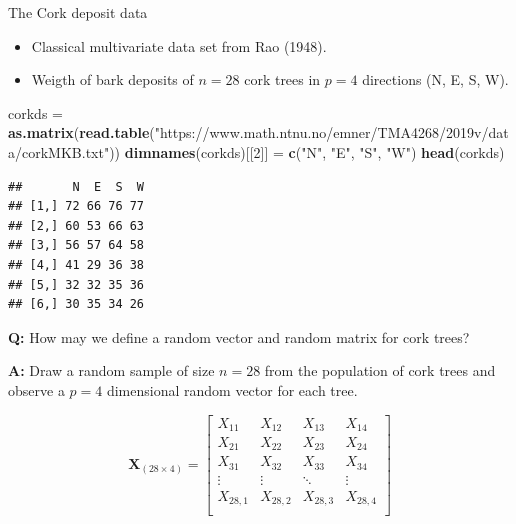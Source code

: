 \documentclass[ignorenonframetext,]{beamer}
\newenvironment{Shaded}{\begin{snugshade}}{\end{snugshade}}
\newcommand{\KeywordTok}[1]{\textcolor[rgb]{0.13,0.29,0.53}{\textbf{#1}}}
\newcommand{\DecValTok}[1]{\textcolor[rgb]{0.00,0.00,0.81}{#1}}
\newcommand{\StringTok}[1]{\textcolor[rgb]{0.31,0.60,0.02}{#1}}
\newcommand{\NormalTok}[1]{#1}
\providecommand{\tightlist}{%
  \setlength{\itemsep}{0pt}\setlength{\parskip}{0pt}}
\begin{document}
\begin{frame}[fragile]

\begin{block}{The Cork deposit data}

\begin{itemize}
\tightlist
\item
  Classical multivariate data set from Rao (1948).
\item
  Weigth of bark deposits of \(n=28\) cork trees in \(p=4\) directions
  (N, E, S, W).
\end{itemize}

\begin{Shaded}
\begin{Highlighting}[]
\NormalTok{corkds =}\StringTok{ }\KeywordTok{as.matrix}\NormalTok{(}\KeywordTok{read.table}\NormalTok{(}\StringTok{"https://www.math.ntnu.no/emner/TMA4268/2019v/data/corkMKB.txt"}\NormalTok{))}
\KeywordTok{dimnames}\NormalTok{(corkds)[[}\DecValTok{2}\NormalTok{]] =}\StringTok{ }\KeywordTok{c}\NormalTok{(}\StringTok{"N"}\NormalTok{, }\StringTok{"E"}\NormalTok{, }\StringTok{"S"}\NormalTok{, }\StringTok{"W"}\NormalTok{)}
\KeywordTok{head}\NormalTok{(corkds)}
\end{Highlighting}
\end{Shaded}

\begin{verbatim}
##       N  E  S  W
## [1,] 72 66 76 77
## [2,] 60 53 66 63
## [3,] 56 57 64 58
## [4,] 41 29 36 38
## [5,] 32 32 35 36
## [6,] 30 35 34 26
\end{verbatim}

\textbf{Q:} How may we define a random vector and random matrix for cork
trees?

\end{block}

\end{frame}

\begin{frame}

\textbf{A:} Draw a random sample of size \(n=28\) from the population of
cork trees and observe a \(p=4\) dimensional random vector for each
tree.

\[\mathbf{X}_{(28 \times 4)}=\left[ \begin{array}{cccc}X_{11} & X_{12} & X_{13}& X_{14}\\ X_{21} & X_{22} & X_{23}& X_{24}\\ X_{31} & X_{32} & X_{33}& X_{34}\\ \vdots & \vdots & \ddots & \vdots\\ X_{28,1} & X_{28,2} & X_{28,3}& X_{28,4}\\ \end{array} \right]\]

\end{frame}
\end{document}
